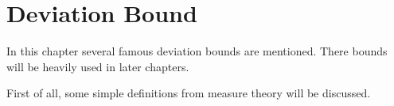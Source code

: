 \documentclass[../main.tex]{subfiles}
\begin{document}
\chapter{Deviation Bound}
In this chapter several famous deviation bounds are mentioned. There bounds will be heavily used in later chapters.

First of all, some simple definitions from measure theory will be discussed.
\end{document}
